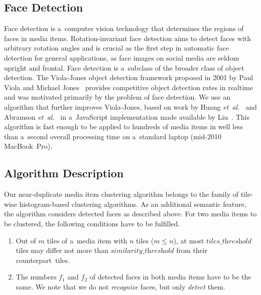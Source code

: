 \subsection{Face Detection}
\label{sec:face-detection}

Face detection is a~computer vision technology
that determines the regions of faces in media items.
Rotation-invariant face detection aims to detect faces with arbitrary
rotation angles and is crucial as the first step in automatic face detection
for general applications, as face images on social media are seldom upright and frontal.
Face detection is a~subclass of the broader class of object detection.
The Viola-Jones object detection framework proposed in 2001
by Paul Viola and Michael
Jones~\cite{viola2001objectdetection,viola2004facedetection}
provides competitive object detection rates in realtime
and was motivated primarily by the problem of face detection.
We use an algorithm that further improves Viola-Jones,
based on work by Huang \emph{et~al.}\ \cite{huang2007facedetection}
and Abramson \emph{et~al.}\ \cite{abramson2007yef}
in a~JavaScript implementation made available by Liu~\cite{liu2012facedetection}.
This algorithm is fast enough to be applied to hundreds of media items
in well less than a~second overall processing time on a~standard laptop
(mid-2010 MacBook~Pro).

\subsection{Algorithm Description}

Our near-duplicate media item clustering algorithm belongs to the family of
tile-wise histogram-based clustering algorithms.
As an additional semantic feature, the algorithm considers detected faces
as described above.
For two media items to be clustered,
the following conditions have to be fulfilled.

\begin{enumerate}
  \item Out of $m$ tiles of a~media item with $n$ tiles ($m \leq n$),
    at most $\textit{tiles\_threshold}$ tiles may differ not more than $\textit{similarity\_threshold}$
    from their counterpart~tiles.
  \item The numbers $f_1$ and $f_2$ of detected faces in both media items
    have to be the same.
    We note that we do not \emph{recognize} faces, but only \emph{detect} them.
\end{enumerate}

